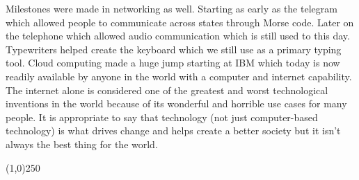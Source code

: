 \documentclass[12pt,a4paper]{article}
\begin{document}
    Milestones were made in networking as well. Starting as early as the telegram which allowed people to communicate across states through Morse code. Later on the telephone which allowed audio communication which is still used to this day. Typewriters helped create the keyboard which we still use as a primary typing tool. Cloud computing made a huge jump starting at IBM which today is now readily available by anyone in the world with a computer and internet capability. The internet alone is considered one of the greatest and worst technological inventions in the world because of its wonderful and horrible use cases for many people. 
    It is appropriate to say that technology (not just computer-based technology) is what drives change and helps create a better society but it isn't always the best thing for the world.
    \begin{center}\line(1,0){250}\end{center}
\end{document}
